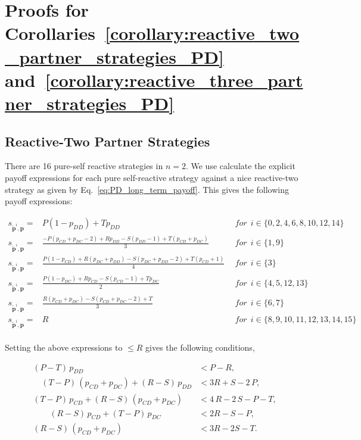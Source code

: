 \documentclass{article}
\theoremstyle{definition}
\begin{document}
\section{Proofs for Corollaries~\ref{corollary:reactive_two_partner_strategies_PD}
and~\ref{corollary:reactive_three_partner_strategies_PD}}

\subsection{Reactive-Two Partner Strategies}

There are 16 pure-self reactive strategies in $n=2$. We use calculate the
explicit payoff expressions for each pure self-reactive strategy against a nice
reactive-two strategy as given by Eq.~\eqref{eq:PD_long_term_payoff}.
This gives the following payoff expressions:

\begin{equation*}
  \begin{array}{lcl}
  s_{\mathbf{\tilde{p}}^{i}, \mathbf{p}} = & P (1 - p_{DD}) + T p_{DD} & ~~for~~ i \in \{0, 2, 4, 6, 8, 10, 12, 14\} \\ [0.3cm]
  s_{\mathbf{\tilde{p}}^{i}, \mathbf{p}} = & \frac{-P(p_{CD} + p_{DC} - 2) + Rp_{DD} - S(p_{DD} - 1) + T(p_{CD} + p_{DC})}{3} & ~~for~~ i \in \{1, 9\} \\ [0.3cm]
  s_{\mathbf{\tilde{p}}^{i}, \mathbf{p}} = & \frac{P(1 - p_{CD}) + R(p_{DC} + p_{DD}) - S(p_{DC} + p_{DD} - 2) + T(p_{CD} + 1)}{4} & ~~for~~ i \in \{3\} \\ [0.3cm]
  s_{\mathbf{\tilde{p}}^{i}, \mathbf{p}} = & \frac{P(1 - p_{DC}) + Rp_{CD} - S(p_{CD} - 1) + Tp_{DC}}{2} & ~~for~~ i \in \{4, 5, 12, 13\} \\ [0.3cm]
  s_{\mathbf{\tilde{p}}^{i}, \mathbf{p}} = & \frac{R(p_{CD} + p_{DC}) - S(p_{CD} + p_{DC} - 2) + T}{3} & ~~for~~ i \in \{6, 7\} \\ [0.3cm]
  s_{\mathbf{\tilde{p}}^{i}, \mathbf{p}} = & R & ~~for~~ i \in \{8, 9, 10, 11, 12, 13, 14, 15\} \\ [0.3cm]
\end{array}
\end{equation*}

Setting the above expressions to $\leq R$ gives the following conditions,

\begin{equation*}
  \begin{array}{cl}
  (P - T)\, p_{DD} & < P - R, \\ [0.4cm]
  \quad (T - P) \, (p_{CD} + p_{DC}) + (R - S)\,p_{DD} & < 3 R + S - 2\,P, \\[0.4cm]
  (T - P)\, p_{CD} + (R - S)\, (p_{CD} + p_{DC}) & < 4\,R - 2\,S - P - T, \\[0.4cm]
  \qquad \left(R - S\right)\, p_{CD} + \left(T - P\right)\,p_{DC} & < 2 R - S - P, \\[0.4cm]
  (R - S)\,(p_{CD} + p_{DC}) & < 3 R - 2 S - T.
\end{array}
\end{equation*}
\end{document}
